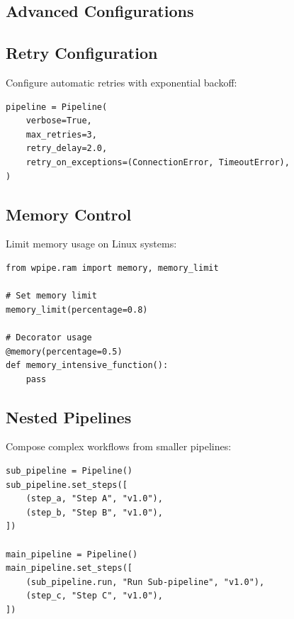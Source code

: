 \documentclass[12pt,a4paper]{report}
\begin{document}
\begin{appendices}
\chapter{Advanced Configurations}
\cleardoublepage

\section{Retry Configuration}

Configure automatic retries with exponential backoff:

\begin{lstlisting}[caption={Retry Configuration}, label={lst:retry-config}]
pipeline = Pipeline(
    verbose=True,
    max_retries=3,
    retry_delay=2.0,
    retry_on_exceptions=(ConnectionError, TimeoutError),
)
\end{lstlisting}

\section{Memory Control}

Limit memory usage on Linux systems:

\begin{lstlisting}[caption={Memory Control}, label={lst:memory}]
from wpipe.ram import memory, memory_limit

# Set memory limit
memory_limit(percentage=0.8)

# Decorator usage
@memory(percentage=0.5)
def memory_intensive_function():
    pass
\end{lstlisting}

\section{Nested Pipelines}

Compose complex workflows from smaller pipelines:

\begin{lstlisting}[caption={Nested Pipeline}, label={lst:nested}]
sub_pipeline = Pipeline()
sub_pipeline.set_steps([
    (step_a, "Step A", "v1.0"),
    (step_b, "Step B", "v1.0"),
])

main_pipeline = Pipeline()
main_pipeline.set_steps([
    (sub_pipeline.run, "Run Sub-pipeline", "v1.0"),
    (step_c, "Step C", "v1.0"),
])
\end{lstlisting}


\end{appendices}
\end{document}
